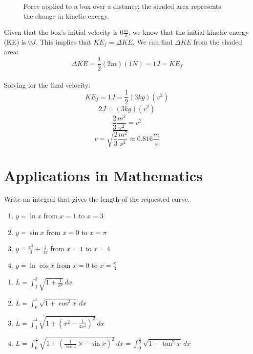 \begin{figure}[htbp]
 \caption{Force applied to a box over a distance; the shaded area 
 represents the change in kinetic energy.}
 \label{fig:KEbox}
\end{figure}

Given that the box's initial velocity is $0 \frac{m}{s}$, we know that 
the initial kinetic energy (KE) is $0J$. This implies that $KE_f = 
\Delta KE$. We can find $\Delta KE$ from the shaded area:\\
$$\Delta KE = \frac{1}{2} (2m) (1N) = 1 J = KE_f$$\\
Solving for the final velocity:\\
$$KE_f = 1 J = \frac{1}{2}(3kg)(v^2)$$
$$2 J = (3 kg) (v^2)$$
$$\frac{2}{3} \frac{m^2}{s^2} = v^2$$
$$v=\sqrt{\frac{2}{3} \frac{m^2}{s^2}} \approx 0.816 \frac{m}{s}$$


\section{Applications in Mathematics}

\begin{Exercise}[label=length1]
Write an integral that gives the length of the requested curve.
	\begin{enumerate}
	\item $y = \ln{x}$ from $x = 1$ to $x = 3$
	\item $y = \sin{x}$ from $x = 0$ to $x = \pi$
	\item $y = \frac{x^3}{3} + \frac{1}{4x}$ from $x = 1$ to $x = 4$
	\item $y = \ln{\cos{x}}$ from $x = 0$ to $x = \frac{\pi}{3}$
	\end{enumerate}	 
\end{Exercise}

\begin{Answer}[ref=length1]
	\begin{enumerate}
	\item $L = \int_{1}^{3} \sqrt{1 + \frac{1}{x^2}}\,dx$
	\item $L = \int_{0}^{\pi} \sqrt{1 + \cos^2{x}}\,dx$
	\item $L = \int_{1}^{4} \sqrt{1 + (x^2-\frac{1}{4x^2})^2}\,dx$
	\item $L = \int_{0}^{\frac{\pi}{3}} \sqrt{1 + (\frac{1}{\cos{x}} 
	\times - \sin{x})^2}\,dx = \int_{0}^{\frac{\pi}{3}} \sqrt{1 + 
	\tan^2{x}}\,dx$
	\end{enumerate}
\end{Answer}


